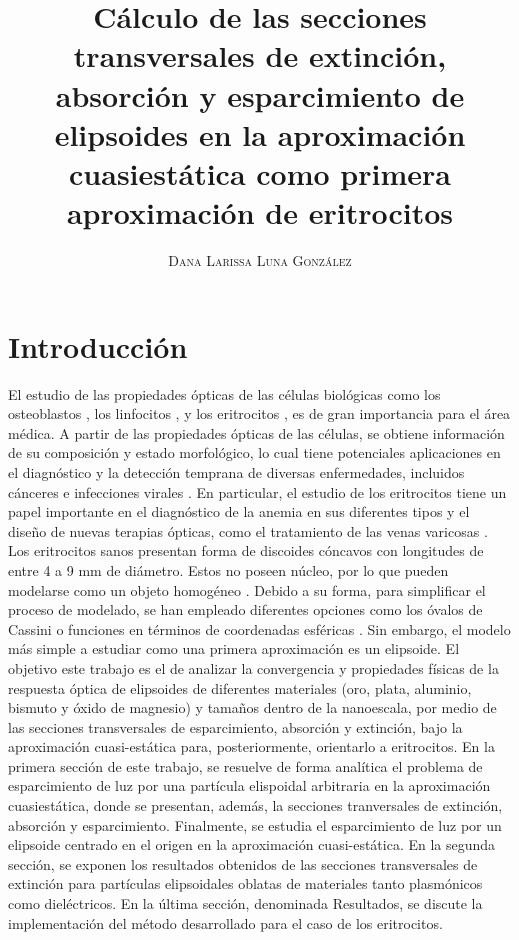 \documentclass[paper=letter,8.5pt]{article}
\title{\vspace{-15mm}\fontsize{17pt}\selectfont\textbf{Cálculo de las secciones transversales de extinción, absorción y esparcimiento de elipsoides en la aproximación cuasiestática como primera aproximación de eritrocitos }} %
\author{
\large
{\textsc{ Dana Larissa Luna González}}\\[2mm]}
\date{}
\begin{document}
\maketitle %
\thispagestyle{fancy} %
\section{Introducción}
El estudio de las propiedades ópticas de las células biológicas como los osteoblastos \cite{Osteo}, los linfocitos \cite{Linfo}, y los eritrocitos \cite{Blood}, es de gran importancia para el área médica. A partir de las propiedades ópticas de las células, se obtiene información de su composición y estado morfológico, lo cual tiene potenciales aplicaciones en el diagnóstico y la detección temprana de diversas enfermedades, incluidos cánceres e infecciones virales \cite{Linfo}. En particular, el estudio de los eritrocitos tiene un papel importante en el diagnóstico de la anemia en sus diferentes tipos y el diseño de nuevas terapias ópticas, como el tratamiento de las venas varicosas \cite{Blood}. \\

Los eritrocitos sanos presentan forma de discoides cóncavos con longitudes de entre 4 a 9 mm de diámetro. Estos no poseen núcleo, por lo que pueden modelarse como un objeto homogéneo \cite{Cassini}. Debido a su forma, para simplificar el proceso de modelado, se han empleado diferentes opciones como los óvalos de Cassini \cite{Cassini} o funciones en términos de coordenadas esféricas \cite{Esferico}. Sin embargo, el modelo más simple a estudiar como una primera aproximación es un elipsoide. El objetivo este trabajo es el de analizar la convergencia y propiedades físicas de la respuesta óptica de elipsoides de diferentes materiales (oro, plata, aluminio, bismuto y óxido de magnesio) y tamaños dentro de la nanoescala, por medio de las secciones transversales de esparcimiento, absorción y extinción, bajo la aproximación cuasi-estática para, posteriormente, orientarlo a eritrocitos. En la primera sección de este trabajo, se resuelve de forma analítica el problema de esparcimiento de luz por una partícula elispoidal arbitraria en la aproximación cuasiestática, donde se presentan, además, la secciones tranversales de extinción, absorción y esparcimiento. Finalmente, se estudia el esparcimiento de luz por un elipsoide centrado en el origen en la aproximación cuasi-estática. En la segunda sección, se exponen los resultados obtenidos de las secciones transversales de extinción para partículas elipsoidales oblatas de materiales tanto plasmónicos como dieléctricos. En la última sección, denominada Resultados, se discute la implementación del método desarrollado para el caso de los eritrocitos.
\end{document}
